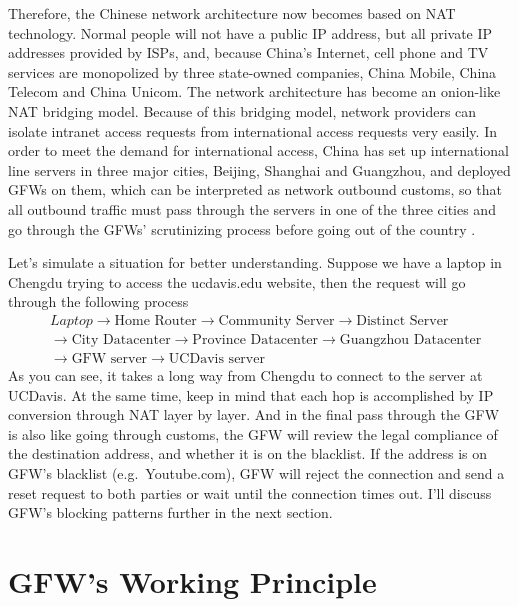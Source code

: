 \documentclass[11pt]{article}
\begin{document}
Therefore, the Chinese network architecture now becomes based on NAT technology.
Normal people will not have a public IP address, but all private IP
addresses provided by ISPs, and, because China's Internet, cell phone and TV
services are monopolized by three state-owned companies, China Mobile, China
Telecom and China Unicom. The network architecture has become an onion-like NAT
bridging model. Because of this bridging model, network providers can isolate
intranet access requests from international access requests very easily. In
order to meet the demand for international access, China has set up
international line servers in three major cities, Beijing, Shanghai and
Guangzhou, and deployed GFWs on them, which can be interpreted as network
outbound customs, so that all outbound traffic must pass through the servers in
one of the three cities and go through the GFWs' scrutinizing process before
going out of the country \cite{GlobalNetServer}.

Let's simulate a situation for better understanding. Suppose we have a laptop in
Chengdu trying to access the ucdavis.edu website, then the request will go
through the following process
\begin{align*} &Laptop \rightarrow \text{Home Router} \rightarrow
\text{Community Server} \rightarrow \text{Distinct Server}\\ &\rightarrow
\text{City Datacenter} \rightarrow \text{Province Datacenter} \rightarrow
\text{Guangzhou Datacenter}\\ &\rightarrow \text{GFW server} \rightarrow
\text{UCDavis server} \end{align*}
As you can see, it takes a long way from Chengdu to connect to the server at UCDavis.
At the same time, keep in mind that each hop is accomplished by IP conversion
through NAT layer by layer. And in the final pass through the GFW is also like
going through customs, the GFW will review the legal compliance of the
destination address, and whether it is on the blacklist. If the address is on
GFW's blacklist (e.g.\ Youtube.com), GFW will reject the connection and send a
reset request to both parties or wait until the connection times out. I'll
discuss GFW's blocking patterns further in the next section.

\section{GFW's Working Principle}
\end{document}
